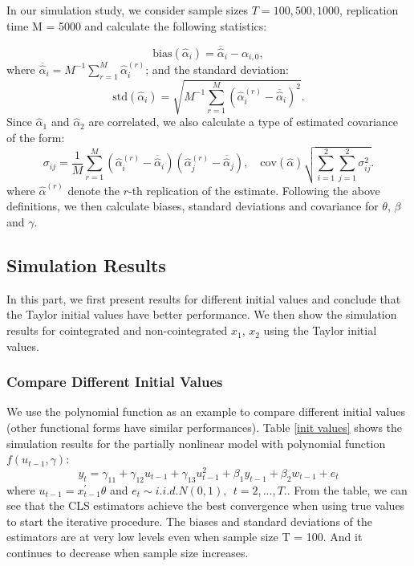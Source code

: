 \documentclass[a4paper,12pt,times,numbered,print,index]{report}
\numberwithin{equation}{section}
\begin{document}
In our simulation study, we consider sample sizes $T = 100, 500,  1000$, replication time M = 5000 and calculate the following statistics:
	
\[
\text{bias}({\hat\alpha_i})=\overline{\widehat{\alpha}}_{i}-\alpha_{i,0}, 
\]%
where $\overline{\widehat{\alpha}}_{i}=M^{-1}\sum_{r=1}^{M}\widehat{\alpha}_{i}^{(r)} $; and the standard deviation: 
\[
\text{std}({\hat\alpha_i}) =\sqrt{M^{-1}\sum_{r=1}^{M}\left( \widehat{\alpha}_{i}^{(r)}-\overline{\widehat{\alpha}}_{i}\right) ^{2}}. 
\]%
Since $\widehat{\alpha}_1$ and $\widehat{\alpha}_{2}$ are correlated, we also calculate a type of estimated covariance of the form:
\begin{equation*}
	\label{std of theta}
	\sigma_{ij}=\frac{1}{M} \sum_{r=1}^{M}\left(\widehat{\alpha}_{i}^{(r)}-\overline{\widehat{\alpha}}_{i}\right)\left(\widehat{\alpha}_{j}^{(r)}-\overline{\widehat{\alpha}}_{j}\right), \quad \text {cov}(\hat{\alpha}) \sqrt{\sum_{i=1}^{2}\sum_{j=1}^{2}\sigma_{ij}^{2}}.
\end{equation*}
where $\widehat{\alpha}^{(r)}$ denote the $r$-th replication of the estimate.
Following the above definitions, we then calculate biases, standard deviations and covariance for $\theta$, $\beta$ and $\gamma$.
	

\subsection{Simulation Results}

In this part, we first present results for different initial values and conclude that the Taylor initial values have better performance. We then show the simulation results for cointegrated and non-cointegrated $x_1$, $x_2$ using the Taylor initial values.


\subsubsection{Compare Different Initial Values}
We use the polynomial function as an example to compare different initial values (other functional forms have similar performances).
Table \ref{init values} shows the simulation results for the partially nonlinear model with polynomial function $f\left( u_{t-1},\gamma\right)$:
$$
y_{t}  = \gamma_{11}+ \gamma_{12}{u}_{t-1}+\gamma_{13}{u}_{t-1}^{2} +\beta_{1}y_{t-1} + \beta_2w_{t-1} +e_t
$$
where ${u}_{t-1} = x^{\prime}_{t-1}\theta$ and $e_{t}\sim i.i.d.N\left( 0,1\right) ,\ \ t=2,...,T$.. From the table, we can see that the CLS estimators achieve the best convergence when using true values to start the iterative procedure. The biases and standard deviations of the estimators are at very low levels even when sample size T = 100. And it continues to decrease when sample size increases.
\end{document}
